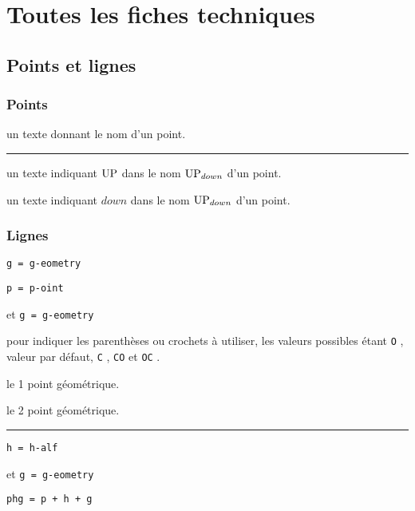 \documentclass[12pt,a4paper]{article}
\theoremstyle{definition}
\newcommand\separation{
	\medskip
	\hfill\rule{0.5\textwidth}{0.75pt}\hfill
	\medskip
}
\newcommand\mwhyprefix[2]{%
	\texttt{#1 = #1-#2}%
}
\newcommand\prefix[1]{%
	\texttt{#1}%
}
\begin{document}
\newpage
\section{Toutes les fiches techniques} \label{techincal-ids}






\subsection{Points et lignes}

\subsubsection{Points}




\IDarg{} un texte donnant le nom d'un point.


\separation



 un texte indiquant $\pt{UP}$ dans le nom $\pt*{UP}{down}$ d'un point.

 un texte indiquant $down$ dans le nom $\pt*{UP}{down}$ d'un point.




\subsubsection{Lignes}



   \hfill \mwhyprefix{g}{eometry}

  \hfill \mwhyprefix{p}{oint}
                              et \mwhyprefix{g}{eometry}

\IDoption{} pour indiquer les parenthèses ou crochets à utiliser, les valeurs possibles étant \prefix{O}, valeur par défaut, \prefix{C}, \prefix{CO} et \prefix{OC}.

 le 1\ier{} point géométrique.

 le 2\ieme{} point géométrique.


\separation


   \hfill \mwhyprefix{h}{alf}
                             et \mwhyprefix{g}{eometry}

  \hfill \prefix{phg = p + h + g}
\end{document}
